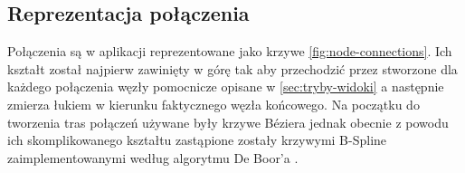 \subsection{Reprezentacja połączenia} 
Połączenia są w aplikacji reprezentowane jako krzywe \ref{fig:node-connections}. Ich kształt został najpierw zawinięty w górę tak aby przechodzić przez stworzone dla każdego połączenia węzły pomocnicze opisane w \ref{sec:tryby-widoki} a następnie zmierza łukiem w kierunku faktycznego węzła końcowego. Na początku do tworzenia tras połączeń używane były krzywe Béziera jednak obecnie z powodu ich skomplikowanego kształtu zastąpione zostały krzywymi B-Spline zaimplementowanymi według algorytmu De Boor'a \cite{Wiki:DeBoorsAlg}.

